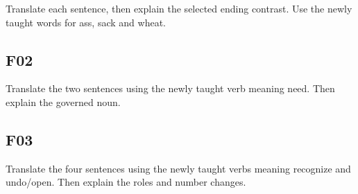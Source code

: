 Translate each sentence, then explain the selected ending contrast. Use the newly taught words for ass, sack and wheat.






\subsection*{F02}

Translate the two sentences using the newly taught verb meaning need. Then explain the governed noun.




\subsection*{F03}

Translate the four sentences using the newly taught verbs meaning recognize and undo/\allowbreak{}open. Then explain the roles and number changes.

